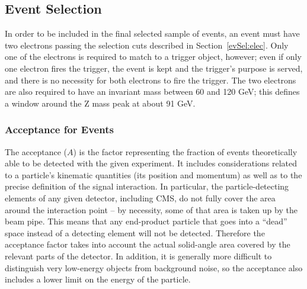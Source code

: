 \subsection{\Zee Event Selection}
\label{evSel:zee}

In order to be included in the final selected sample of \Zee events, 
an event must have two electrons passing the selection cuts 
described in Section~\ref{evSel:elec}.  
Only one of the electrons is required to match to a trigger object, however; 
even if only one electron fires the trigger, 
the event is kept and the trigger's purpose is served, 
and there is no 
necessity for both electrons to fire the trigger.  
The two electrons are also required to have an invariant mass 
between 60 and 120 GeV; 
this defines a window around the Z mass peak at about 91 GeV.  

\subsubsection{Acceptance for \Zee Events}  %
\label{evSel:acc}


The acceptance %
($A$) %
is the factor representing the fraction of events 
theoretically able to be detected with the given experiment.  
It includes considerations related to a particle's kinematic quantities 
(its position and momentum)
as well as to the precise definition of the signal interaction.  
In particular, the particle-detecting elements of any given 
detector, including CMS, do not fully cover the area around 
the interaction point -- 
by necessity, some of that area is taken up by the beam pipe.  
This means that any end-product particle that goes into a 
``dead'' space instead of a detecting element will not be 
detected.  
Therefore the acceptance factor takes into account the 
actual solid-angle area covered by the relevant parts of the detector.  
In addition, it is generally more difficult to distinguish 
very low-energy objects from background noise, 
so the acceptance also includes a lower limit on the 
energy of the particle.  

